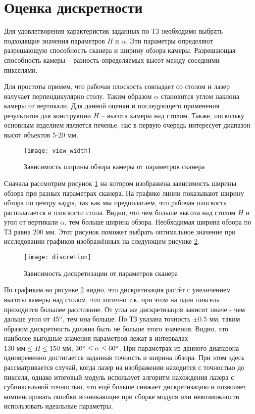     \section{Оценка дискретности}\label{sec:error}
        Для удовлетворения характеристик заданных по ТЗ необходимо выбрать подходящие значения параметров $ H $ и $\alpha$. Эти параметры определяют разрешающую способность сканера и ширину обзора камеры. Разрешающая способность камеры -- разность определяемых высот между соседними пикселями.
        
        Для простоты примем, что рабочая плоскость совпадает со столом и лазер излучает перпендикулярно столу. Таким образом $\alpha$ становится углом наклона камеры от вертикали. Для данной оценки и последующего применения результатов для конструкции $ H $ -- высота камеры над столом. Также, поскольку основным изделием является печенье, нас в первую очередь интересует диапазон высот объектов 5-20 мм.
        \begin{figure}[H]
            \centering
            \texttt{[image: view\_width]}
            \caption{Зависимость ширины обзора камеры от параметров сканера}
            \label{pic:view_width}
        \end{figure}
        Сначала рассмотрим рисунок \ref{pic:view_width} на котором изображена зависимость ширины обзора при разных параметрах сканера. На графике линии показывают ширину обзора по центру кадра, так как мы предполагаем, что рабочая плоскость располагается в плоскости стола. Видно, что чем больше высота над столом $ H $ и угол от вертикали $ \alpha $, тем больше ширина обзора. Необходимая ширина обзора по ТЗ равна 200 мм. Этот рисунок поможет выбрать оптимальное значение при исследовании графиков изображённых на следующем рисунке \ref{pic:discretion}.
        \begin{figure}[H]
            \centering
            \texttt{[image: discretion]}
            \caption{Зависимость дискретизации от параметров сканера}
            \label{pic:discretion}
        \end{figure}
        По графикам на рисунке \ref{pic:discretion} видно, что дискретизация растёт с увеличением высоты камеры над столом, что логично т.к. при этом на один пиксель приходится большее расстояние. От угла же дискретизация зависит иначе - чем дальше угол от $ 45^{\circ} $, тем  она больше. По ТЗ указана точность $ \pm 0.5\text{ мм} $, таким образом дискретность должна быть не больше этого значения. Видно, что наиболее выгодные значения параметров лежат в интервалах $ 130 \text{ мм} \le H \le 150 \text{ мм} $; $ 30^{\circ} \le \alpha \le 60^{\circ} $. 
        При параметрах из данного диапазона одновременно достигается заданная точность и ширина обзора.
        При этом здесь рассматривается случай, когда лазер на изображении находится с точностью до пикселя, однако итоговый модуль использует алгоритм нахождения лазера с субпиксельной точностью, что ещё больше снижает дискретизацию и позволяет компенсировать ошибки возникающие при сборке модуля или невозможности использовать идеальные параметры.

